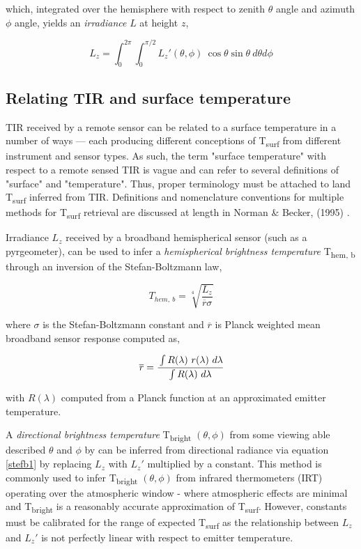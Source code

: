 \noindent which, integrated over the hemisphere with respect to zenith \(\theta\) angle and azimuth \(\phi\) angle, yields an \textit{irradiance} $ L $ at height $ z $,

\begin{equation}
L_z = \int_{0}^{2\pi} \int_{0}^{\pi/2} L_z'(\theta, \phi) ~ \cos\theta \sin\theta ~ d\theta d\phi
\end{equation}

\subsection{Relating TIR and surface temperature}

TIR received by a remote sensor can be related to a surface temperature in a number of ways --- each producing different conceptions of T\textsubscript{surf} from different instrument and sensor types. As such, the term "surface temperature" with respect to a remote sensed TIR is vague and can refer to several definitions of "surface" and "temperature". Thus, proper terminology must be attached to land T\textsubscript{surf} inferred from TIR. Definitions and nomenclature conventions for multiple methods for T\textsubscript{surf} retrieval are discussed at length in Norman \& Becker, (1995) \cite{Norman1995}.

 Irradiance $L_z$ received by a broadband hemispherical sensor (such as a pyrgeometer), can be used to infer a \textit{hemispherical brightness temperature} T\textsubscript{hem, b} through an inversion of the Stefan-Boltzmann law,

\begin{equation}
\label{stefb1}
T_{hem,~ b} = \sqrt[4]{\frac{L_z}{\overline{r}\sigma}}
\end{equation}

\noindent where $ \sigma $ is the Stefan-Boltzmann constant and $ \overline{r} $ is Planck weighted mean broadband sensor response computed as,

\begin{equation}
\label{meansens}
\overline{r} = \cfrac{\int R(\lambda) ~ r(\lambda)~d\lambda}{\int R(\lambda) ~ d\lambda}
\end{equation}

\noindent with $ R(\lambda) $ computed from a Planck function at an approximated emitter temperature. 

A \textit{directional brightness temperature} T\textsubscript{bright} $(\theta, \phi)$ from some viewing able described $\theta$ and $\phi$ by can be inferred from directional radiance via equation \ref{stefb1} by replacing $ L_z $ with $L_z'$ multiplied by a constant. This method is commonly used to infer T\textsubscript{bright} $(\theta, \phi)$ from infrared thermometers (IRT) operating over the atmospheric window - where atmospheric effects are minimal and T\textsubscript{bright} is a reasonably accurate approximation of T\textsubscript{surf}. However, constants must be calibrated for the range of expected T\textsubscript{surf} as the relationship between $ L_z $ and $L_z'$  is not perfectly linear with respect to emitter temperature.

